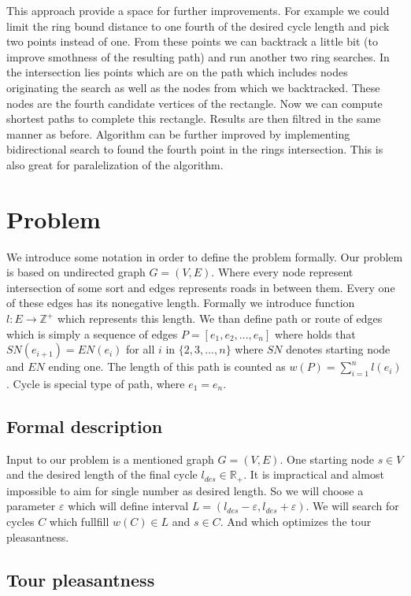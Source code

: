 \documentclass{ctuthesis}
\begin{document}
This approach provide a space for further improvements. For example we could limit the ring bound distance to one fourth of the desired cycle length and pick two points instead of one. From these points we can backtrack a little bit (to improve smothness of the resulting path) and run another two ring searches. In the intersection lies points which are on the path which includes nodes originating the search as well as the nodes from which we backtracked. These nodes are the fourth candidate vertices of the rectangle. Now we can compute shortest paths to complete this rectangle. Results are then filtred in the same manner as before. Algorithm can be further improved by implementing bidirectional search to found the fourth point in the rings intersection. This is also great for paralelization of the algorithm. \par

\chapter{Problem}
We introduce some notation in order to define the problem formally. Our problem is based on undirected graph \(G=(V, E)\). Where every node represent intersection of some sort and edges represents roads in between them. Every one of these edges has its nonegative length. Formally we introduce function \(l:E \rightarrow \mathbb{Z^+}\) which represents this length. We than define path or route of edges which is simply a sequence of edges \(P = [e_1, e_2, ..., e_n]\) where holds that \(SN(e_{i+1}) = EN(e_i) \) for all \(i\) in \(\{2, 3, ..., n\}\) where \(SN\) denotes starting node and \(EN\) ending one. The length of this path is counted as \(w(P)=\sum_{i=1}^{n}{l(e_i)}\). Cycle is special type of path, where \(e_1 = e_n\).

\section{Formal description}
Input to our problem is a mentioned graph \(G=(V, E)\). One starting node \(s \in V\) and the desired length of the final cycle \(l_{des} \in \mathbb{R_+}\). It is impractical and almost impossible to aim for single number as desired length. So we will choose a parameter \(\varepsilon\) which will define interval \(L = (l_{des}-\varepsilon, l_{des}+\varepsilon)\). We will search for cycles \(C\) which fullfill \(w(C) \in L\) and \(s \in C\). And which optimizes the tour pleasantness.
	
\section{Tour pleasantness}
\end{document}
